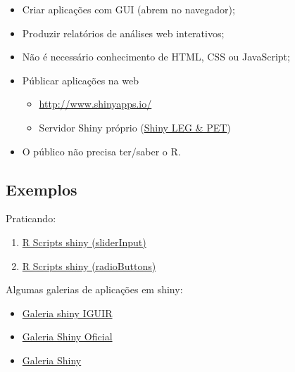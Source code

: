 
\begin{frame}
  \begin{itemize}
  \item Criar aplicações com GUI (abrem no navegador);
  \item Produzir relatórios de análises web interativos;
  \item Não é necessário conhecimento de HTML, CSS ou JavaScript;
  \item Públicar aplicações na web
    \begin{itemize}
    \item \url{http://www.shinyapps.io/}
    \item Servidor Shiny próprio (\href{http://200.17.213.89:3838/iguir/list/}{Shiny LEG \& PET})
    \end{itemize}
  \item O público não precisa ter/saber o R.
  \end{itemize}
\end{frame}


\subsection*{Exemplos}

\begin{frame}
 Praticando:
  \begin{enumerate}
  \item \href{run:./R/shiny/shiny}{R Scripts shiny (sliderInput)}
  \item \href{run:./R/shiny/shiny2}{R Scripts shiny (radioButtons)}
  \end{enumerate}

  \vspace{0.5cm}
  Algumas galerias de aplicações em shiny:

  \begin{itemize}
  \item \href{http://200.17.213.89:3838/iguir/list/}{Galeria shiny
      IGUIR}
  \item \href{http://shiny.rstudio.com/gallery/}{Galeria Shiny Oficial}
  \item \href{http://www.showmeshiny.com/}{Galeria Shiny}
  \end{itemize}
  
\end{frame}

